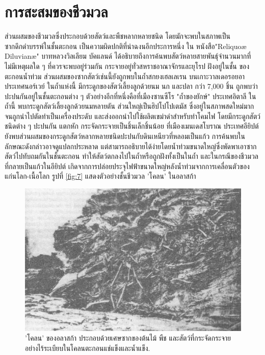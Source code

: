 \documentclass[10pt,twocolumn,letterpaper]{article}
\begin{document}
\section{การสะสมของชีวมวล}

ส่วนผสมของชีวมวลซึ่งประกอบด้วยสัตว์และพืชหลากหลายชนิด โดยมักจะพบในสภาพเป็นซากดึกดำบรรพ์ในชั้นตะกอน เป็นความผิดปกติที่น่าฉงนอีกประการหนึ่ง ใน หนังสือ"Reliquoæ Diluvianæ" บาทหลวงวิลเลียม บัคแลนด์ ได้อธิบายถึงการค้นพบสัตว์หลายสายพันธุ์จำนวนมากที่ไม่มีเหตุผลใด ๆ ที่ควรจะพบอยู่ร่วมกัน กระจายอยู่ทั่วสหราชอาณาจักรและยุโรป ฝังอยู่ในชั้น ของตะกอนน้ำท่วม \cite{58} ส่วนผสมของซากสัตว์เช่นนี้ยังถูกพบในถ้ำสกยงเฮลเลเรน บนเกาะวาลเดอรอยอา ประเทศนอร์เวย์ ในถ้ำแห่งนี้ มีกระดูกของสัตว์เลี้ยงลูกด้วยนม นก และปลา กว่า 7,000 ชิ้น ถูกพบว่าปะปนกันอยู่ในชั้นตะกอนต่าง ๆ \cite{59} ตัวอย่างอีกที่หนึ่งคือที่เมืองซานซีโร "ถ้ำของยักษ์" ประเทศอิตาลี ในถ้ำนี้ พบกระดูกสัตว์เลี้ยงลูกด้วยนมหลายตัน ส่วนใหญ่เป็นฮิปโปโปเตมัส ซึ่งอยู่ในสภาพสดใหม่มากจนถูกนำไปตัดทำเป็นเครื่องประดับ และส่งออกนำไปใช้ผลิตเขม่าดำสำหรับทำโคมไฟ โดยมีกระดูกสัตว์ชนิดต่าง ๆ ปะปนกัน แตกหัก กระจัดกระจายเป็นชิ้นเล็กชิ้นน้อย \cite{60,61} ที่เมืองเมนเดสโบราณ ประเทศอียิปต์ ยังพบส่วนผสมของกระดูกสัตว์หลากหลายชนิดปะปนกับดินเหนียวที่หลอมเป็นแก้ว \cite{57} การค้นพบในลักษณะดังกล่าวอาจดูแปลกประหลาด แต่สามารถอธิบายได้ง่ายโดยน้ำท่วมขนาดใหญ่ซึ่งพัดพาเอาซากสัตว์ไปทับถมกันในชั้นตะกอน  ทำให้สัตว์ตกลงไปในถ้ำหรือถูกฝังทั้งเป็นในถ้ำ และในกรณีของชีวมวลที่กลายเป็นแก้วในอียิปต์ เกิดจากการปล่อยประจุไฟฟ้าขนาดใหญ่หลังน้ำท่วมจากการเคลื่อนตัวของแก่นโลก-เนื้อโลก รูปที่ \ref{fig:7} แสดงตัวอย่างชั้นชีวมวล 'โคลน' ในอลาสก้า \cite{56}

\begin{figure}[t]
\begin{center}
   \includegraphics[width=1\linewidth]{muck-crop.jpeg}
\end{center}
   \caption{'โคลน' ของอลาสก้า ประกอบด้วยเศษซากของต้นไม้ พืช และสัตว์ที่กระจัดกระจายอย่างไร้ระเบียบในโคลนตะกอนแช่แข็งและน้ำแข็ง\cite{146}.}
\label{fig:7}
\label{fig:onecol}
\end{figure}
\end{document}
